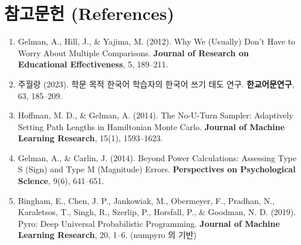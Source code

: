 \documentclass[11pt]{article}
\begin{document}
\clearpage
\section*{참고문헌 (References)}

\begin{enumerate}
\item Gelman, A., Hill, J., \& Yajima, M. (2012). Why We (Usually) Don't Have to Worry About Multiple Comparisons. \textbf{Journal of Research on Educational Effectiveness}, 5, 189--211.

\item 주월랑 (2023). 학문 목적 한국어 학습자의 한국어 쓰기 태도 연구. \textbf{한교어문연구}, 63, 185--209.

\item Hoffman, M. D., \& Gelman, A. (2014). The No-U-Turn Sampler: Adaptively Setting Path Lengths in Hamiltonian Monte Carlo. \textbf{Journal of Machine Learning Research}, 15(1), 1593--1623.

\item Gelman, A., \& Carlin, J. (2014). Beyond Power Calculations: Assessing Type S (Sign) and Type M (Magnitude) Errors. \textbf{Perspectives on Psychological Science}, 9(6), 641--651.

\item Bingham, E., Chen, J. P., Jankowiak, M., Obermeyer, F., Pradhan, N., Karaletsos, T., Singh, R., Szerlip, P., Horsfall, P., \& Goodman, N. D. (2019). Pyro: Deep Universal Probabilistic Programming. \textbf{Journal of Machine Learning Research}, 20, 1--6. (numpyro 의 기반)
\end{enumerate}
\end{document}

